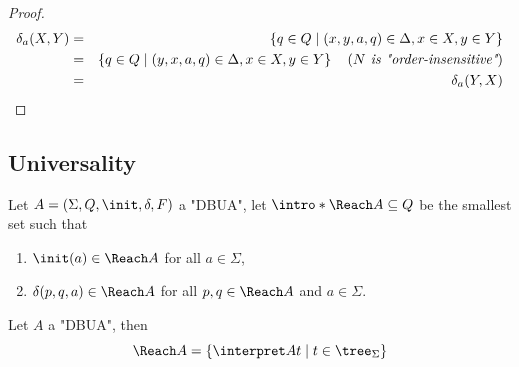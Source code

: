 \documentclass[twoside]{article}
\begin{document}
\begin{proof}
	\begin{eqnarray*}
		\delta_a (X,Y) &=& \left\{q \in Q \mid (x,y,a,q) \in \Delta, x \in X, y \in Y\right\} \\
		&=& \left\{q \in Q \mid (y,x,a,q) \in \Delta, x \in X, y \in Y\right\}  \quad\left(\textit{$N$ is "order-insensitive"}\right) \\
		&=& \delta_a (Y,X)
	\end{eqnarray*}
\end{proof}


\subsection{Universality}\label{sec:UniversalityAutomata}

\begin{definition}
	Let $A = \DBUA$ a "DBUA", let $\intro* \Reach A \subseteq Q$ be the smallest set such that
	\begin{enumerate}
		\item $\init (a) \in \Reach A$ for all $a \in \Sigma$,
		\item $\delta (p,q,a) \in \Reach A$ for all $p,q \in \Reach A$ and $a \in \Sigma$.
	\end{enumerate}
\end{definition}


\begin{lemma}
	Let $A$ a "DBUA", then
	\[\Reach A = \setdef {\interpret A t} {t \in \tree_\Sigma} \]
\end{lemma}
\end{document}

